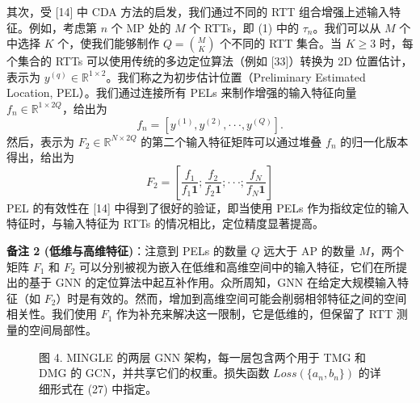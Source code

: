 \documentclass[journal]{IEEEtran}
\begin{document}
其次，受 [14] 中 CDA 方法的启发，我们通过不同的 RTT 组合增强上述输入特征。例如，考虑第 $n$ 个 MP 处的 $M$ 个 RTTs，即 (1) 中的 $\tau_{n}$。我们可以从 $M$ 个中选择 $K$ 个，使我们能够制作 $Q=\binom{M}{K}$ 个不同的 RTT 集合。当 $K \ge 3$ 时，每个集合的 RTTs 可以使用传统的多边定位算法（例如 [33]）转换为 2D 位置估计，表示为 $y^{(q)}\in\mathbb{R}^{1\times2}$。我们称之为初步估计位置（Preliminary Estimated Location, PEL）。我们通过连接所有 PELs 来制作增强的输入特征向量 $f_{n}\in\mathbb{R}^{1\times2Q}$，给出为
\begin{equation}
f_{n}=[y^{(1)},y^{(2)},\cdot\cdot\cdot,y^{(Q)}]. \label{eq:14}
\end{equation}
然后，表示为 $F_{2}\in\mathbb{R}^{N\times2Q}$ 的第二个输入特征矩阵可以通过堆叠 $f_{n}$ 的归一化版本得出，给出为
\begin{equation}
F_{2}=[\frac{f_{1}}{f_{1}\mathbf{1}};\frac{f_{2}}{f_{2}\mathbf{1}};\cdot\cdot\cdot;\frac{f_{N}}{f_{N}\mathbf{1}}] \label{eq:15}
\end{equation}
PEL 的有效性在 [14] 中得到了很好的验证，即当使用 PELs 作为指纹定位的输入特征时，与输入特征为 RTTs 的情况相比，定位精度显著提高。

\textbf{备注 2 (低维与高维特征)}：注意到 PELs 的数量 $Q$ 远大于 AP 的数量 $M$，两个矩阵 $F_{1}$ 和 $F_{2}$ 可以分别被视为嵌入在低维和高维空间中的输入特征，它们在所提出的基于 GNN 的定位算法中起互补作用。众所周知，GNN 在给定大规模输入特征（如 $F_{2}$）时是有效的。然而，增加到高维空间可能会削弱相邻特征之间的空间相关性。我们使用 $F_{1}$ 作为补充来解决这一限制，它是低维的，但保留了 RTT 测量的空间局部性。

\begin{figure}[t]
\centering
\caption{图 4. MINGLE 的两层 GNN 架构，每一层包含两个用于 TMG 和 DMG 的 GCN，并共享它们的权重。损失函数 $Loss(\{a_{n},b_{n}\})$ 的详细形式在 (27) 中指定。}
\label{fig:4}
\end{figure}
\end{document}
